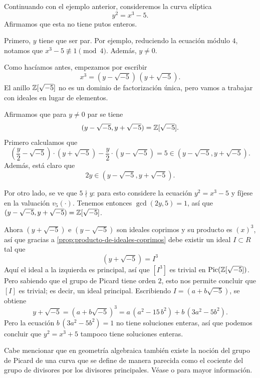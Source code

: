 \begin{ejemplo}
  Continuando con el ejemplo anterior, consideremos la curva elíptica
  $$y^2 = x^3 - 5.$$
  Afirmamos que esta no tiene putos enteros.

  Primero, $y$ tiene que ser par. Por ejemplo, reduciendo la ecuación módulo
  $4$, notamos que $x^3 - 5 \not\equiv 1 \pmod{4}$. Además, $y \ne 0$.

  Como hacíamos antes, empezamos por escribir
  $$x^3 = (y - \sqrt{-5})\,(y + \sqrt{-5}).$$
  El anillo $\mathbb{Z} [\sqrt{-5}]$ no es un dominio de factorización única,
  pero vamos a trabajar con ideales en lugar de elementos.

  Afirmamos que para $y \ne 0$ par se tiene
  $$(y - \sqrt{-5}, y + \sqrt{-5}) = \mathbb{Z} [\sqrt{-5}].$$
  Primero calculamos que
  \[ \left(\frac{y}{2} - \sqrt{-5}\right) \cdot (y + \sqrt{-5})
       - \frac{y}{2}\cdot (y - \sqrt{-5}) = 5
     \in (y - \sqrt{-5}, y + \sqrt{-5}). \]
  Además, está claro que
  $$2y \in (y - \sqrt{-5}, y + \sqrt{-5}).$$

  Por otro lado, se ve que $5 \nmid y$: para esto considere la ecuación
  $y^2 = x^3 - 5$ y fíjese en la valuación $v_5 (\cdot)$. Tenemos entonces
  $\gcd (2y, 5) = 1$, así que
  $(y - \sqrt{-5}, y + \sqrt{-5}) = \mathbb{Z} [\sqrt{-5}]$.

  Ahora $(y + \sqrt{-5})$ e $(y - \sqrt{-5})$ son ideales coprimos y su producto
  es $(x)^3$, así que gracias a \ref{prop:producto-de-ideales-coprimos} debe
  existir un ideal $I \subset R$ tal que
  $$(y + \sqrt{-5}) = I^3$$
  Aquí el ideal a la izquierda es principal, así que $[I^3]$ es trivial en
  $\operatorname{Pic} (\mathbb{Z} [\sqrt{-5}])$. Pero sabiendo que el grupo de Picard tiene orden
  $2$, esto nos permite concluir que $[I]$ es trivial; es decir, un ideal
  principal. Escribiendo $I = (a + b\sqrt{-5})$, se obtiene
  $$y + \sqrt{-5} = (a + b\sqrt{-5})^3 = a\,(a^2 - 15\,b^2) + b\,(3a^2 - 5b^2).$$
  Pero la ecuación $b\,(3a^2 - 5b^2) = 1$ no tiene soluciones enteras, así que
  podemos concluir que $y^2 = x^3 + 5$ tampoco tiene soluciones enteras.
\end{ejemplo}

Cabe mencionar que en geometría algebraica también existe la noción del grupo de
Picard de una curva que se define de manera parecida como el cociente del grupo
de divisores por los divisores principales. Véase
\cite[Chapter II]{Silverman-GTM106} o \cite{Lorenzini-1996} para mayor
información.


